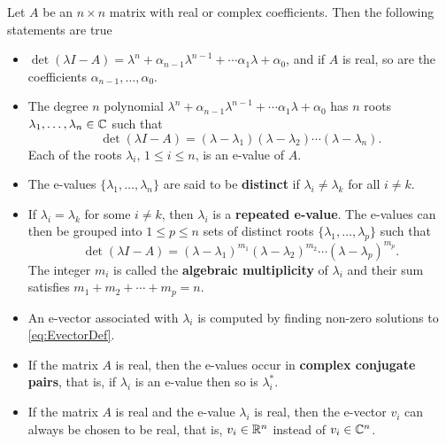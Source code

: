 \vspace*{0.5cm}
\begin{tcolorbox}[sharp corners, colback=green!30, colframe=green!80!blue, title=\textbf{\large Fundamental Theorem of Algebra (and a bit More)}]
Let $A$ be an $n\times n$ matrix with real or complex coefficients. Then the following statements are true
\begin{itemize}
    \item $\det(\lambda I - A) = \lambda^n + \alpha_{n-1} \lambda^{n-1} + \cdots \alpha_1 \lambda + \alpha_0$, and if $A$ is real, so are the coefficients $\alpha_{n-1}, \ldots, \alpha_0.$
    
    \item The degree $n$ polynomial $\lambda^n + \alpha_{n-1} \lambda^{n-1} + \cdots \alpha_1 \lambda + \alpha_0$ has $n$ roots $\lambda_1, \ldots, \lambda_n \in \mathbb C$ such that
    $$\det(\lambda I - A) = (\lambda - \lambda_1) (\lambda - \lambda_2) \cdots (\lambda - \lambda_n). $$
    Each of the roots $\lambda_i$, $1 \le i \le n$, is an e-value of $A$.
    
    \item The e-values $\{\lambda_1, \ldots, \lambda_n\}$ are said to be \textbf{distinct} if $\lambda_i \neq \lambda_k$ for all $i \neq k$.
    
    \item If $\lambda_i=\lambda_k$ for some $i \neq k$, then $\lambda_i$ is a \textbf{repeated e-value}. The e-values can then be grouped into $1\le p \le n $ sets of distinct roots $ \{\lambda_1, \ldots, \lambda_p \} $ such that 
    $$\det(\lambda I - A) = (\lambda - \lambda_1)^{m_1} (\lambda - \lambda_2)^{m_2} \cdots (\lambda - \lambda_p)^{m_p}. $$
    The integer $m_i$ is called the \textbf{algebraic multiplicity} of $\lambda_i$ and their sum satisfies
    $m_1 + m_2 + \cdots + m_p = n.$
    
    \item An e-vector associated with $\lambda_i$ is computed by finding non-zero solutions to \eqref{eq:EvectorDef}. 
    
     \item If the matrix $A$ is real, then the e-values occur in \textbf{complex conjugate pairs}, that is, if $\lambda_i$ is an e-value then so is $\lambda^\ast_i$.
    
    \item If the matrix $A$ is real and the e-value $\lambda_i$ is real, then the e-vector $v_i$ can always be chosen to be real, that is, $v_i \in \mathbb R^n$ instead of $v_i \in \mathbb C^n$. 
    

\end{itemize}
\end{tcolorbox}

